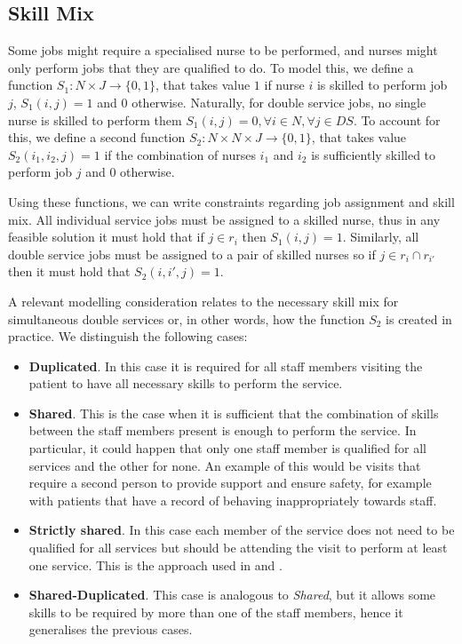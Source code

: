 \documentclass[a4paper,11pt,authoryear]{elsarticle}
\begin{document}
\subsection{Skill Mix}
\label{sub:skillmix}
\noindent Some jobs might require a specialised nurse to be performed, and nurses might only perform jobs that they are qualified to do. To model this, we define a function $S_1: N\times J \rightarrow \{0,1\}$, that takes value $1$ if nurse $i$ is skilled to perform job $j$, $S_1(i,j) = 1$ and $0$ otherwise. 
Naturally, for double service jobs, no single nurse is skilled to perform them $S_1(i,j) = 0, \forall i \in N, \forall j \in DS$. To account for this, we define a second function $S_2: N\times N\times J \rightarrow \{0,1\}$, that takes value $S_2(i_1,i_2,j) = 1$ if the combination of nurses $i_1$ and $i_2$ is sufficiently skilled to perform job $j$ and $0$ otherwise. 

Using these functions, we can write constraints regarding job assignment and skill mix.
All individual service jobs must be assigned to a skilled nurse, thus in any feasible solution it must hold that if $j \in r_i$ then $S_1(i,j) = 1$. Similarly, all double service jobs must be assigned to a pair of skilled nurses so if $j \in r_i \cap r_{i'}$ then it must hold that $S_2(i, i', j) = 1$.


A relevant modelling consideration relates to the necessary skill mix for simultaneous double services or, in other words, how the function $S_2$ is created in practice. We distinguish the following cases:
\begin{itemize}
    \item \textbf{Duplicated}. In this case it is required for all staff members visiting the patient to have all necessary skills to perform the service.
    \item \textbf{Shared}. This is the case when it is sufficient that the combination of skills between the staff members present is enough to perform the service. In particular, it could happen that only one staff member is qualified for all services and the other for none. An example of this would be visits that require a second person to provide support and ensure safety, for example with patients that have a record of behaving inappropriately towards staff.
    \item \textbf{Strictly shared}. In this case each member of the service does not need to be qualified for all services but should be attending the visit to perform at least one service. This is the approach used in \cite{mankowska2014} and \cite{aithaddadene2016}.
    \item \textbf{Shared-Duplicated}. This case is analogous to \emph{Shared}, but it allows some skills to be required by more than one of the staff members, hence it generalises the previous cases.
\end{itemize}
\end{document}
